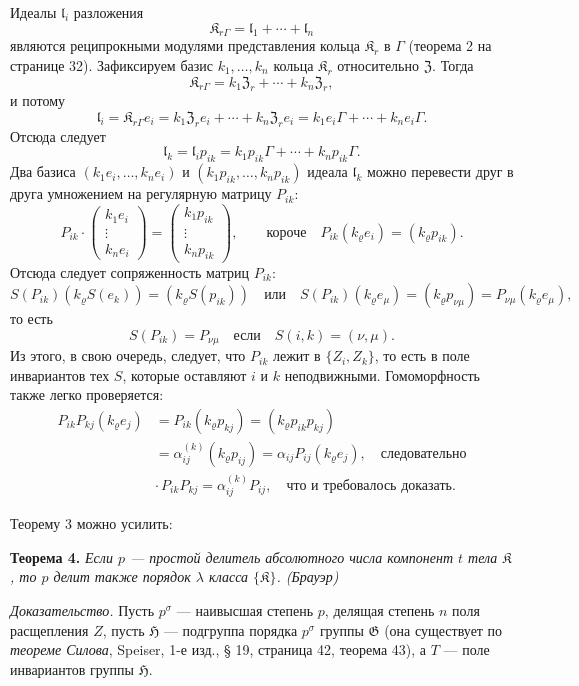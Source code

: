 \documentclass[11pt]{article}
\begin{document}
Идеалы \(\mathfrak l_i\) разложения
\[
\mathfrak K_{r\Gamma}=\mathfrak l_1+\cdots+\mathfrak l_n
\]
являются реципрокными модулями представления кольца \(\mathfrak K_r\) в \(\Gamma\) (теорема 2 на странице 32). Зафиксируем базис \(k_1,\ldots,k_n\) кольца \(\mathfrak K_r\) относительно \(\mathfrak Z\). Тогда
\[
\mathfrak K_{r\Gamma}=k_1\mathfrak Z_r+\cdots+k_n\mathfrak Z_r,
\]
и потому
\[
\mathfrak l_i=\mathfrak K_{r\Gamma}e_i
=k_1\mathfrak Z_r e_i+\cdots+k_n\mathfrak Z_r e_i
=k_1e_i\Gamma+\cdots+k_ne_i\Gamma.
\]
Отсюда следует
\[
\mathfrak l_k=\mathfrak l_i p_{ik}
=k_1p_{ik}\Gamma+\cdots+k_np_{ik}\Gamma.
\]
Два базиса \((k_1e_i,\ldots,k_ne_i)\) и \((k_1p_{ik},\ldots,k_np_{ik})\) идеала \(\mathfrak l_k\) можно перевести друг в друга умножением на регулярную матрицу \(P_{ik}\):
\[
P_{ik}\cdot
\begin{pmatrix}
k_1e_i\\ \vdots\\ k_ne_i
\end{pmatrix}
=
\begin{pmatrix}
k_1p_{ik}\\ \vdots\\ k_np_{ik}
\end{pmatrix},
\qquad
\text{короче}\quad
P_{ik}(k_\varrho e_i)=(k_\varrho p_{ik}).
\]
Отсюда следует сопряженность матриц \(P_{ik}\):
\[
S(P_{ik})(k_\varrho S(e_k))=(k_\varrho S(p_{ik}))
\quad\text{или}\quad
S(P_{ik})(k_\varrho e_\mu)=(k_\varrho p_{\nu\mu})
=P_{\nu\mu}(k_\varrho e_\mu),
\]
то есть
\[
S(P_{ik})=P_{\nu\mu}\quad\text{если}\quad S(i,k)=(\nu,\mu).
\]
Из этого, в свою очередь, следует, что \(P_{ik}\) лежит в \(\{Z_i,Z_k\}\), то есть в поле инвариантов тех \(S\), которые оставляют \(i\) и \(k\) неподвижными. Гомоморфность также легко проверяется:
\[
\begin{split}
P_{ik}P_{kj}(k_\varrho e_j)
&=P_{ik}(k_\varrho p_{kj})
=(k_\varrho p_{ik}p_{kj})\\
&=\alpha_{ij}^{(k)}(k_\varrho p_{ij})
=\alpha_{ij}P_{ij}(k_\varrho e_j),
\quad\text{следовательно}\\
&\cdot\, P_{ik}P_{kj}=\alpha_{ij}^{(k)}P_{ij},
\quad\text{что и требовалось доказать.}
\end{split}
\]

Теорему 3 можно усилить:

\textbf{Теорема 4.} \emph{Если \(p\) --- простой делитель абсолютного числа компонент \(t\) тела \(\mathfrak K\), то \(p\) делит также порядок \(\lambda\) класса \(\{\mathfrak K\}\). (Брауэр)}

\emph{Доказательство.} Пусть \(p^\sigma\) --- наивысшая степень \(p\), делящая степень \(n\) поля расщепления \(Z\), пусть \(\mathfrak H\) --- подгруппа порядка \(p^\sigma\) группы \(\mathfrak G\) (она существует по \emph{теореме Силова}, Speiser, 1-е изд., § 19, страница 42, теорема 43), а \(T\) --- поле инвариантов группы \(\mathfrak H\).
\end{document}
